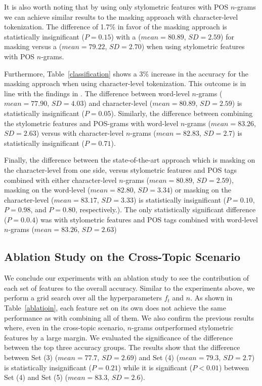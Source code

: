 \documentclass[11pt]{article}
\begin{document}
It is also worth noting that by using only stylometric features with POS $n$-grams we can achieve similar results to the masking approach with character-level tokenization. The difference of 1.7\% in favor of the masking approach is statistically insignificant ($P=0.15$) with a ($mean=80.89$, $SD=2.59$) for masking versus a ($mean=79.22$, $SD=2.70$) when using stylometric features with POS $n$-grams. 

Furthermore, Table~\ref{classification} shows a 3\% increase in the accuracy for the masking approach when using character-level tokenization. This outcome is in line with the findings in \citep{Stamatatos.E:2017}. The difference between word-level $n$-grams ($mean=77.90$, $SD=4.03$) and character-level ($mean=80.89$, $SD=2.59$) is statistically insignificant ($P=0.05$). Similarly, the difference between combining the stylometric features and POS-grams with word-level $n$-grams ($mean=83.26$, $SD=2.63$) versus with character-level $n$-grams ($mean=82.83$, $SD=2.7$) is statistically insignificant ($P=0.71$).

Finally, the difference between the state-of-the-art approach which is masking on the character-level from one side, versus stylometric features and POS tags combined with either character-level $n$-grams ($mean=80.89$, $SD=2.59$), masking on the word-level ($mean=82.80$, $SD=3.34$) or masking on the character-level ($mean=83.17$, $SD=3.33$) is statistically insignificant ($P=0.10$, $P=0.98$, and $P=0.80$, respectively.). The only statistically significant difference ($P=0.0.4$) was with stylometric features and POS tags combined with word-level $n$-grams ($mean=83.26$, $SD=2.63$)

\subsection{Ablation Study on the Cross-Topic Scenario\label{sec:abl}}
We conclude our experiments with an ablation study to see the contribution of each set of features to the overall accuracy. Similar to the experiments above, we perform a grid search over all the hyperparameters $f_t$ and $n$. As shown in Table~\ref{ablatioin}, each feature set on its own does not achieve the same performance as with combining all of them. We also confirm the previous results where, even in the cross-topic scenario, $n$-grams outperformed stylometric features by a large margin. We evaluated the significance of the difference between the top three accuracy groups. The results show that the difference between Set (3) ($mean=77.7$, $SD=2.69$) and Set (4) ($mean=79.3$, $SD=2.7$) is statistically insignificant ($P=0.21$) while it is significant ($P<0.01$) between Set (4) and Set (5) ($mean=83.3$, $SD=2.6$). 
\end{document}
